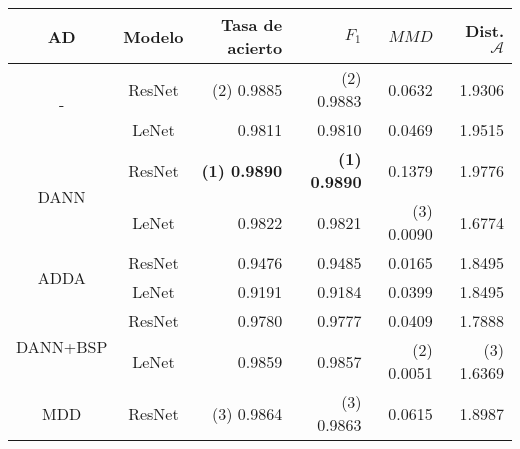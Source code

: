 \begin{table}[H]
    \centering
    \begin{tabular}{cc|rr|rr}
        \toprule
        AD                           & Modelo & Tasa de acierto                     & $F_1$                               & $MMD$                               & Dist. $\mathcal{A}$                 \\
        \midrule
        \multirow[c]{2}{*}{-}        & ResNet & {\footnotesize (2)} 0.9885          & {\footnotesize (2)} 0.9883          & 0.0632                              & 1.9306                              \\
                                     & LeNet  & 0.9811                              & 0.9810                              & 0.0469                              & 1.9515                              \\\hline
        \multirow[c]{2}{*}{DANN}     & ResNet & \textbf{{\footnotesize (1)} 0.9890} & \textbf{{\footnotesize (1)} 0.9890} & 0.1379                              & 1.9776                              \\
                                     & LeNet  & 0.9822                              & 0.9821                              & {\footnotesize (3)} 0.0090          & 1.6774                              \\\hline
        \multirow[c]{2}{*}{ADDA}     & ResNet & 0.9476                              & 0.9485                              & 0.0165                              & 1.8495                              \\
                                     & LeNet  & 0.9191                              & 0.9184                              & 0.0399                              & 1.8495                              \\\hline
        \multirow[c]{2}{*}{DANN+BSP} & ResNet & 0.9780                              & 0.9777                              & 0.0409                              & 1.7888                              \\
                                     & LeNet  & 0.9859                              & 0.9857                              & {\footnotesize (2)} 0.0051          & {\footnotesize (3)} 1.6369          \\\hline
        \multirow[c]{2}{*}{MDD}      & ResNet & {\footnotesize (3)} 0.9864          & {\footnotesize (3)} 0.9863          & 0.0615                              & 1.8987                              \\

\end{tabular}
\end{table}
